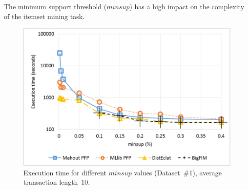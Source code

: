 \documentclass[preprint,review,12pt]{elsarticle}
\begin{document}
The minimum support threshold ($minsup$) has a high impact on the complexity of
the itemset mining task. 





\begin{figure}[!t]
\includegraphics[width=5in]{minsup_1_log.eps}
\caption{Execution time for different $minsup$ values
(Dataset~\#1), average transaction length~10.}
\label{minsup_1}
\end{figure}
\end{document}
